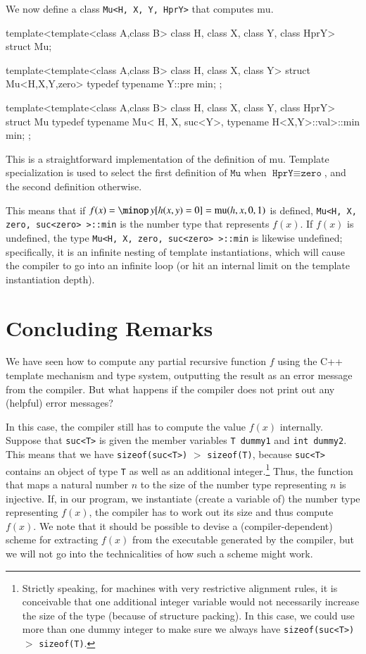 \documentclass[final]{beatcs}
\newcommand{\cppid}[1]{\texttt{#1}}
\newenvironment{cppsrc}{\begingroup \small \selectfont \verbatim}
{\endverbatim \endgroup}
\begin{document}
We now define a class \cppid{Mu<H, X, Y, HprY>} that computes $\mathrm{mu}$.

\begin{cppsrc}
template<template<class A,class B> class H, 
class X, class Y, class HprY> struct Mu;

template<template<class A,class B> class H, 
class X, class Y> struct Mu<H,X,Y,zero>
{
	typedef typename Y::pre min;
};

template<template<class A,class B> class H, 
class X, class Y, class HprY> struct Mu
{
	typedef typename Mu<
	H, X, suc<Y>, typename H<X,Y>::val>::min min;
};
\end{cppsrc}

This is a straightforward implementation of the definition of
$\mathrm{mu}$. Template specialization is used to select the first definition
of $\cppid{Mu}$ when $\cppid{HprY}\equiv\cppid{zero}$, and the second
definition otherwise.

This means that 
if $f(x)=\minop\, y[h(x, y) = 0]=\mathrm{mu}(h,x,0,1)$ is defined,
\cppid{Mu<H, X, zero, suc<zero>~>::min} is the
number type that represents $f(x)$. If 
$f(x)$ is
undefined, the type \cppid{Mu<H, X, zero, suc<zero>~>::min} is likewise
undefined; specifically, it is an infinite nesting of template instantiations,
which will cause the compiler to go into an infinite loop (or hit an internal
limit on the template instantiation depth).


\section{Concluding Remarks}

We have seen how to compute any partial recursive function $f$
using the C++ template mechanism and type system, outputting the result as an
error message from the compiler.
But what happens if the compiler does not print out any (helpful) error 
messages?

In this case, the compiler still has to compute the value
$f(x)$ internally. Suppose
that \cppid{suc<T>} is given the member variables 
\cppid{T dummy1} and \cppid{int dummy2}. This means that we have
\cppid{sizeof(suc<T>)} $>$ \cppid{sizeof(T)}, because \cppid{suc<T>} contains
an object of type \cppid{T} as well as an additional 
integer.\footnote{Strictly speaking, for machines with very restrictive 
alignment rules, it is conceivable that one additional integer variable would 
not necessarily increase the size of the type (because of structure packing).
In this case, we could use more than one dummy integer to make sure we always 
have \cppid{sizeof(suc<T>)} $>$ \cppid{sizeof(T)}.}
Thus, the function that maps a natural number $n$ to the size of the number
type representing $n$ is injective. If, in our program, we instantiate (create
a variable of) the
number type representing $f(x)$, the compiler has to work out its size and
thus compute $f(x)$. We note that it should be possible to devise a
(compiler-dependent) scheme for extracting $f(x)$ from the executable
generated by the compiler, but we will not go into the technicalities of how 
such a scheme might work.
\end{document}

